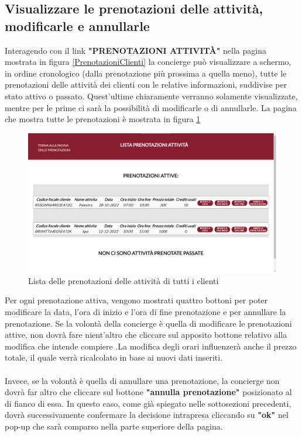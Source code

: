 \documentclass [a4paper, 12pt]{book}
\begin{document}
\subsection{Visualizzare le prenotazioni delle attività, modificarle e annullarle}
Interagendo con il link \textbf{"PRENOTAZIONI ATTIVITÀ"} nella pagina mostrata in figura \ref{PrenotazioniClienti} la concierge può visualizzare a schermo, in ordine cronologico (dalla prenotazione più prossima a quella meno), tutte le prenotazioni delle attività dei clienti con le relative informazioni, suddivise per stato attivo o passato. Quest'ultime chiaramente verranno solamente visualizzate, mentre per le prime ci sarà la possibilità di modificarle o di annullarle. La pagina che mostra tutte le prenotazioni è mostrata in figura \ref{ListaPrenotazioniAttivitaStaff}   \newpage

\begin{figure}[h]
\centering
\includegraphics[scale=0.3]{ListaPrenotazioniAttivitaStaff.png}
\caption{Lista delle prenotazioni delle attività di tutti i clienti}
\label{ListaPrenotazioniAttivitaStaff}
\end{figure}

Per ogni prenotazione attiva, vengono mostrati quattro bottoni per poter modificare la data, l'ora di inizio e l'ora di fine prenotazione e per annullare la prenotazione.
Se la volontà della concierge è quella di modificare le prenotazioni attive, non dovrà fare nient'altro che cliccare sul apposito bottone relativo alla modifica che intende compiere .La modifica degli orari influenzerà anche il prezzo totale, il quale verrà ricalcolato in base ai nuovi dati inseriti.\\\\
Invece, se la volontà è quella di annullare una prenotazione, la concierge non dovrà far altro che cliccare sul bottone \textbf{"annulla prenotazione"} posizionato al di fianco di essa. In questo caso, come già spiegato nelle sottosezioni precedenti, dovrà successivamente confermare la decisione intrapresa cliccando su \textbf{"ok"} nel pop-up che sarà comparso nella parte superiore della pagina.
\end{document}
